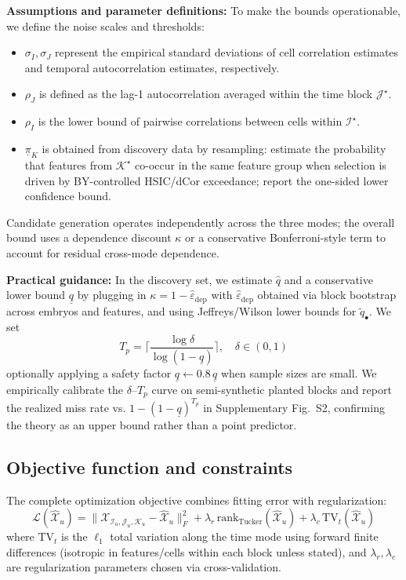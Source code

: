 \documentclass[unnumsec,webpdf,modern,large,namedate]{oup-authoring-template}%
\theoremstyle{thmstyleone}\newtheorem{theorem}{Theorem}
\theoremstyle{thmstyletwo}\newtheorem{example}{Example}
\theoremstyle{thmstylethree}\newtheorem{definition}{Definition}
\begin{document}
\textbf{Assumptions and parameter definitions:} To make the bounds operationable, we define the noise scales and thresholds:
\begin{itemize}
\item $\sigma_I, \sigma_J$ represent the empirical standard deviations of cell correlation estimates and temporal autocorrelation estimates, respectively.
\item $\rho_J$ is defined as the lag-1 autocorrelation averaged within the time block $\mathcal{J}^\star$.
\item $\rho_I$ is the lower bound of pairwise correlations between cells within $\mathcal{I}^\star$.
\item $\underline{\pi}_K$ is obtained from discovery data by resampling: estimate the probability that features from $\mathcal{K}^\star$ co-occur in the same feature group when selection is driven by BY-controlled HSIC/dCor exceedance; report the one-sided lower confidence bound.
\end{itemize}

Candidate generation operates independently across the three modes; the overall bound uses a dependence discount $\kappa$ or a conservative Bonferroni-style term to account for residual cross-mode dependence.

\textbf{Practical guidance:} In the discovery set, we estimate $\hat q$ and a conservative lower bound $\underline q$ by plugging in $\kappa=1-\hat\varepsilon_{\mathrm{dep}}$ with $\hat\varepsilon_{\mathrm{dep}}$ obtained via block bootstrap across embryos and features, and using Jeffreys/Wilson lower bounds for $\tilde q_\bullet$. We set
\begin{equation}
T_p = \Big\lceil \frac{\log \delta}{\log(1-\underline q)} \Big\rceil, \quad \delta\in(0,1)
\label{eq:Tp-selection}
\end{equation}
optionally applying a safety factor $\underline q \leftarrow 0.8\,\underline q$ when sample sizes are small. We empirically calibrate the $\delta$--$T_p$ curve on semi-synthetic planted blocks and report the realized miss rate vs. $1-(1-\underline q)^{T_p}$ in Supplementary Fig.~S2, confirming the theory as an upper bound rather than a point predictor.

\subsection{Objective function and constraints}

The complete optimization objective combines fitting error with regularization:
\begin{equation}
\mathcal{L}(\hat{\mathcal{X}}_u) = \|\mathcal{X}_{\mathcal{I}_u,\mathcal{J}_u,\mathcal{K}_u}-\hat{\mathcal{X}}_u\|_F^2 + \lambda_r \, \text{rank}_{\text{Tucker}}(\hat{\mathcal{X}}_u) + \lambda_c \, \text{TV}_t(\hat{\mathcal{X}}_u)
\label{eq:objective}
\end{equation}
where $\text{TV}_t$ is the $\ell_1$ total variation along the time mode using forward finite differences (isotropic in features/cells within each block unless stated), and $\lambda_r, \lambda_c$ are regularization parameters chosen via cross-validation.
\end{document}
